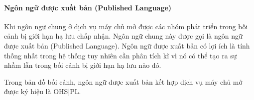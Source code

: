 












\paragraph{Ngôn ngữ được xuất bản (Published Language)}   







Khi ngôn ngữ chung ở dịch vụ máy chủ mở được các nhóm phát triển trong bối cảnh bị giới hạn hạ lưu chấp nhận. Ngôn ngữ chung này được gọi là ngôn ngữ được xuất bản (Published Language). Ngôn ngữ được xuất bản có lợi ích là tính thống nhất trong hệ thống tuy nhiên cần phân tích kĩ vì nó có thể tạo ra sự nhầm lẫn trong bối cảnh bị giới hạn hạ lưu nào đó.

Trong bản đồ bối cảnh, ngôn ngữ được xuất bản kết hợp dịch vụ máy chủ mở được ký hiệu là OHS|PL.








